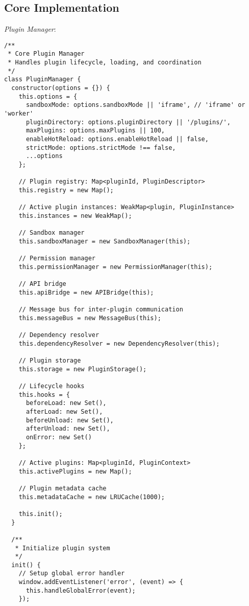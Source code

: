 \documentclass[11pt]{article}
\begin{document}
\subsection{Core Implementation}
\label{sec:org03179e6}

\emph{Plugin Manager}:

\begin{verbatim}
/**
 * Core Plugin Manager
 * Handles plugin lifecycle, loading, and coordination
 */
class PluginManager {
  constructor(options = {}) {
    this.options = {
      sandboxMode: options.sandboxMode || 'iframe', // 'iframe' or 'worker'
      pluginDirectory: options.pluginDirectory || '/plugins/',
      maxPlugins: options.maxPlugins || 100,
      enableHotReload: options.enableHotReload || false,
      strictMode: options.strictMode !== false,
      ...options
    };
    
    // Plugin registry: Map<pluginId, PluginDescriptor>
    this.registry = new Map();
    
    // Active plugin instances: WeakMap<plugin, PluginInstance>
    this.instances = new WeakMap();
    
    // Sandbox manager
    this.sandboxManager = new SandboxManager(this);
    
    // Permission manager
    this.permissionManager = new PermissionManager(this);
    
    // API bridge
    this.apiBridge = new APIBridge(this);
    
    // Message bus for inter-plugin communication
    this.messageBus = new MessageBus(this);
    
    // Dependency resolver
    this.dependencyResolver = new DependencyResolver(this);
    
    // Plugin storage
    this.storage = new PluginStorage();
    
    // Lifecycle hooks
    this.hooks = {
      beforeLoad: new Set(),
      afterLoad: new Set(),
      beforeUnload: new Set(),
      afterUnload: new Set(),
      onError: new Set()
    };
    
    // Active plugins: Map<pluginId, PluginContext>
    this.activePlugins = new Map();
    
    // Plugin metadata cache
    this.metadataCache = new LRUCache(1000);
    
    this.init();
  }
  
  /**
   * Initialize plugin system
   */
  init() {
    // Setup global error handler
    window.addEventListener('error', (event) => {
      this.handleGlobalError(event);
    });
    

\end{verbatim}
\end{document}

